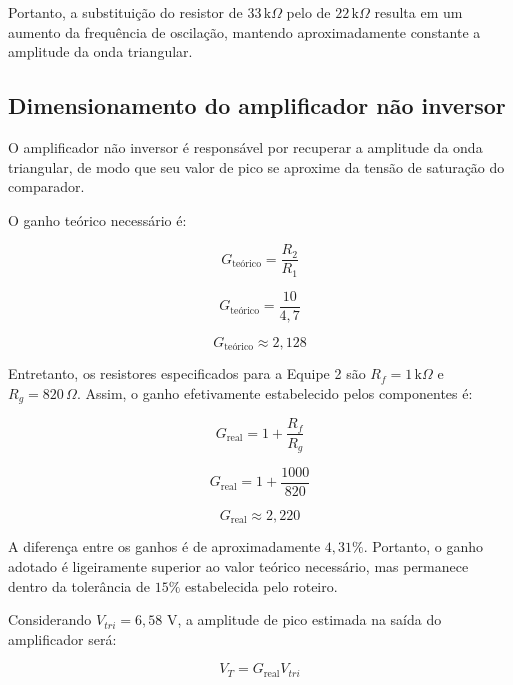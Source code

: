 \documentclass[11pt,a4paper]{article}
\begin{document}
Portanto, a substituição do resistor de $33\,\text{k}\Omega$ pelo de $22\,\text{k}\Omega$ resulta em um aumento da frequência de oscilação, mantendo aproximadamente constante a amplitude da onda triangular.

\subsection{Dimensionamento do amplificador não inversor}

O amplificador não inversor é responsável por recuperar a amplitude da onda triangular, de modo que seu valor de pico se aproxime da tensão de saturação do comparador.

O ganho teórico necessário é:

\begin{equation}
G_{\text{teórico}}=\frac{R_2}{R_1}
\end{equation}

\begin{equation}
G_{\text{teórico}}=\frac{10}{4,7}
\end{equation}

\begin{equation}
\boxed{G_{\text{teórico}}\approx2,128}
\end{equation}

Entretanto, os resistores especificados para a Equipe 2 são $R_f=1\,\text{k}\Omega$ e $R_g=820\,\Omega$. Assim, o ganho efetivamente estabelecido pelos componentes é:

\begin{equation}
G_{\text{real}}=1+\frac{R_f}{R_g}
\end{equation}

\begin{equation}
G_{\text{real}}=1+\frac{1000}{820}
\end{equation}

\begin{equation}
\boxed{G_{\text{real}}\approx2,220}
\end{equation}

A diferença entre os ganhos é de aproximadamente $4,31\%$. Portanto, o ganho adotado é ligeiramente superior ao valor teórico necessário, mas permanece dentro da tolerância de $15\%$ estabelecida pelo roteiro.

Considerando $V_{tri}=6,58$ V, a amplitude de pico estimada na saída do amplificador será:

\begin{equation}
V_T=G_{\text{real}}V_{tri}
\end{equation}
\end{document}
